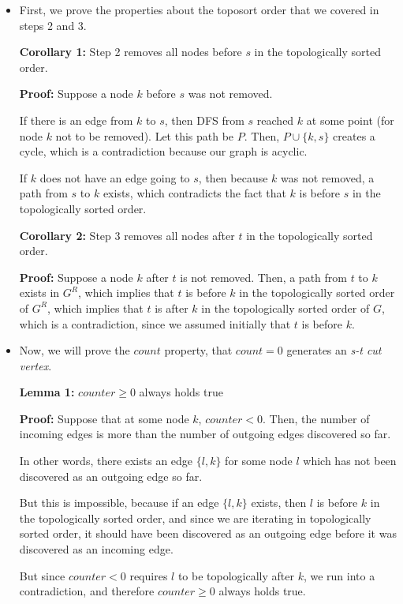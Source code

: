 \documentclass{article}
\begin{document}
\begin{itemize}
\item First, we prove the properties about the toposort order that we covered in steps 2 and 3.

\textbf{Corollary 1:} Step 2 removes all nodes before $s$ in the topologically sorted order.

\textbf{Proof:} Suppose a node $k$ before $s$ was not removed. 

If there is an edge from $k$ to $s$, then DFS from $s$ reached $k$ at some point (for node $k$ not to be removed). Let this path be $P$. Then, $P \cup \{k,s\}$  creates a cycle, which is a contradiction because our graph is acyclic. 

If $k$ does not have an edge going to $s$, then because $k$ was not removed, a path from $s$ to $k$ exists, which contradicts the fact that $k$ is before $s$ in the topologically sorted order. 

\textbf{Corollary 2:} Step 3 removes all nodes after $t$ in the topologically sorted order.

\textbf{Proof:} Suppose a node $k$ after $t$ is not removed. Then, a path from $t$ to $k$ exists in $G^R$, which implies that $t$ is before $k$ in the topologically sorted order of $G^R$, which implies that $t$ is after $k$ in the topologically sorted order of $G$, which is a contradiction, since we assumed initially that $t$ is before $k$.

\item Now, we will prove the $count$ property, that $count = 0$ generates an \emph{s-t cut vertex}.
    
\textbf{Lemma 1:} $counter \geq 0$ always holds true

\textbf{Proof:} Suppose that at some node $k$, $counter < 0$. Then, the number of incoming edges is more than the number of outgoing edges discovered so far. 

In other words, there exists an edge $\{l, k\}$ for some node $l$ which has not been discovered as an outgoing edge so far.

But this is impossible, because if an edge $\{l,k\}$ exists, then $l$ is before $k$ in the topologically sorted order, and since we are iterating in topologically sorted order, it should have been discovered as an outgoing edge before it was discovered as an incoming edge. 

But since $counter < 0$ requires $l$ to be topologically after $k$, we run into a contradiction, and therefore $counter \geq 0$ always holds true.


\end{itemize}
\end{document}
